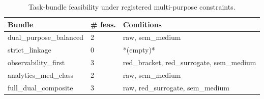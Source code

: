 \begin{table}[t]
\caption{Task-bundle feasibility under registered multi-purpose constraints.}
\label{tab:task-bundles}
\small
\begin{tabular}{@{}lll@{}}
\toprule
Bundle & \# feas. & Conditions \\
\midrule
dual\_purpose\_balanced & 2 & raw, sem\_medium \\
strict\_linkage & 0 & *(empty)* \\
observability\_first & 3 & red\_bracket, red\_surrogate, sem\_medium \\
analytics\_med\_class & 2 & raw, sem\_medium \\
full\_dual\_composite & 3 & raw, red\_surrogate, sem\_medium \\
\bottomrule
\end{tabular}
\end{table}
